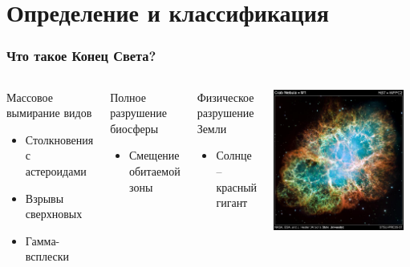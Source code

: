 \documentclass[aspectratio=169]{beamer}
\begin{document}
\section{Определение и классификация}

\begin{frame}
\frametitle{Что такое Конец Света?}
\begin{columns}[c]
\begin{block}{Массовое вымирание видов}
      \begin{itemize}
        \item Столкновения с астероидами
        \item Взрывы сверхновых
        \item Гамма-всплески
      \end{itemize}
\end{block}
\begin{block}{Полное разрушение биосферы}
      \begin{itemize}
      \item Смещение обитаемой зоны
      \end{itemize}
\end{block}
\begin{block}{Физическое разрушение Земли}
      \begin{itemize}
      \item Солнце -- красный гигант
      \end{itemize}
\end{block}
\includegraphics[width=0.95\textwidth]{img/crab_nebula_web_print.jpg}
\end{columns}
\end{frame}
\end{document}
